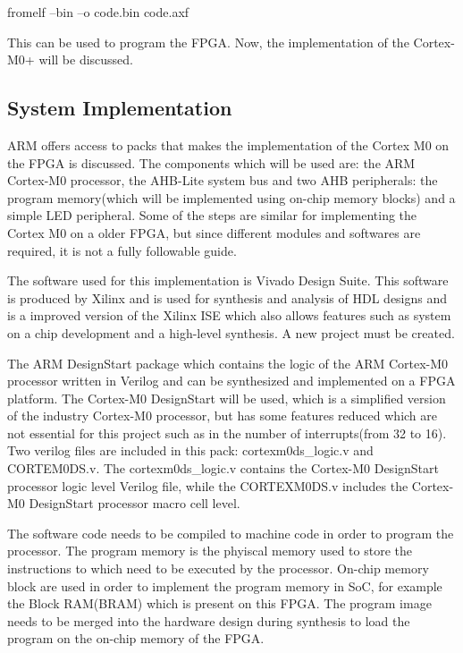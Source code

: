 fromelf --bin --o code.bin code.axf

This can be used to program the FPGA. Now, the implementation of the Cortex-M0+ will be discussed.

\subsection{System Implementation}

ARM offers access to packs that makes the implementation of the Cortex M0 on the FPGA is discussed. The components which will be used are: the ARM Cortex-M0 processor, the AHB-Lite system bus and two AHB peripherals: the program memory(which will be implemented using on-chip memory blocks) and a simple LED peripheral. Some of the steps are similar for implementing the Cortex M0 on a older FPGA, but since different modules and softwares are required, it is not a fully followable guide. 

The software used for this implementation is Vivado Design Suite. This software is produced by Xilinx and is used for synthesis and analysis of HDL designs and is a improved version of the Xilinx ISE which also allows features such as system on a chip development and a high-level synthesis. A new project must be created.

The ARM DesignStart  package which contains the logic of the ARM Cortex-M0 processor written in Verilog and can be synthesized and implemented on a FPGA platform. The Cortex-M0 DesignStart will be used, which is a simplified version of the industry Cortex-M0 processor, but has some features reduced which are not essential for this project such as in the number of interrupts(from 32 to 16). Two verilog files are included in this pack:  cortexm0ds\_logic.v and CORTEM0DS.v. The cortexm0ds\_logic.v contains the Cortex-M0 DesignStart processor logic level Verilog file, while the CORTEXM0DS.v includes the Cortex-M0 DesignStart processor macro cell level.

The software code needs to be compiled to machine code in order to program the processor. The program memory is the phyiscal memory used to store the instructions to which need to be executed by the processor. On-chip memory block are used in order to implement the program memory in SoC, for example the Block RAM(BRAM) which is present on this FPGA. The program image needs to be merged into the hardware design during synthesis to load the program on the on-chip memory of the FPGA.

